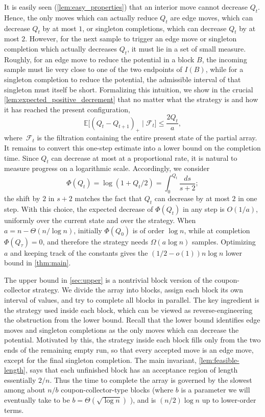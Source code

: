 \documentclass[11pt,reqno,letterpaper]{amsart}
\theoremstyle{definition}
\numberwithin{equation}{section}
\newcommand{\E}{\mathbb{E}}
\newcommand{\mc}{\mathcal}
\begin{document}
It is easily seen (\cref{lem:easy_properties}) that an interior move cannot decrease $Q_t$. Hence, the only moves which can
actually reduce $Q_t$ are edge moves, which can decrease $Q_t$ by at most $1$, or singleton completions, which can decrease $Q_t$ by at most $2$. However, for the next sample to trigger an edge move or singleton completion which actually decreases $Q_t$, it must lie in a set of small measure.  Roughly, for an edge move to reduce the
potential in a block \(B\), the incoming sample must lie very close to one of the
two endpoints of \(I(B)\), while for a singleton completion to reduce the potential,
the admissible interval of that singleton must itself be short.  Formalizing this intuition, we show in the crucial \cref{lem:expected_positive_decrement} that no matter what the strategy is and how it 
has reached the present configuration,
\[
\E\bigl[(Q_t-Q_{t+1})_+\mid \mc F_t\bigr]
\le
\frac{2Q_t}{a},
\]
where~$\mc F_t$ is the filtration containing the entire present state of the partial array.
It remains to convert this one-step estimate into a lower bound on the completion time. Since $Q_t$ can decrease at most at a proportional rate, it is natural to measure progress on a logarithmic scale. Accordingly, we consider 
\[\Phi(Q_t) = \log(1+Q_t/2) = \int_0^{Q_t} \frac{ds}{s+2};\]
the shift by $2$ in $s+2$ matches the fact that $Q_t$ can decrease by at most $2$ in one step. With this choice, the
expected decrease of \(\Phi(Q_t)\) in any step is \(O(1/a)\), uniformly
over the current state and over the strategy.  When \(a = n - \Theta(n/\log n)\), initially
\(\Phi(Q_0)\) is of order \(\log n\), while at completion \(\Phi(Q_\tau)=0\), and therefore the strategy needs \(\Omega(a\log n)\) samples.  Optimizing \(a\) and keeping track of the constants gives the
\((1/2-o(1))n\log n\) lower bound in \cref{thm:main}.


The upper bound in \cref{sec:upper} is a nontrivial block version of the
coupon-collector strategy.  We divide the array into blocks, assign each block
its own interval of values, and try to complete all blocks in parallel.  The key
ingredient is the strategy used inside each block, which can be viewed as
reverse-engineering the obstruction from the lower bound.  Recall that the
lower bound identifies edge moves and singleton completions as the only moves
which can decrease the potential.  Motivated by this, the strategy inside each
block fills only from the two ends of the remaining empty run, so that every
accepted move is an edge move, except for the final singleton completion.  The
main invariant, \cref{lem:feasible-length}, says that each unfinished block has
an acceptance region of length essentially \(2/n\).  Thus the time to complete
the array is governed by the slowest among about \(n/b\) coupon-collector-type
blocks (where \(b\) is a parameter we will eventually take to be \(b = \Theta(\sqrt{\log n})\) ), and is $(n/2) \log n$ up to lower-order terms. 
\end{document}
